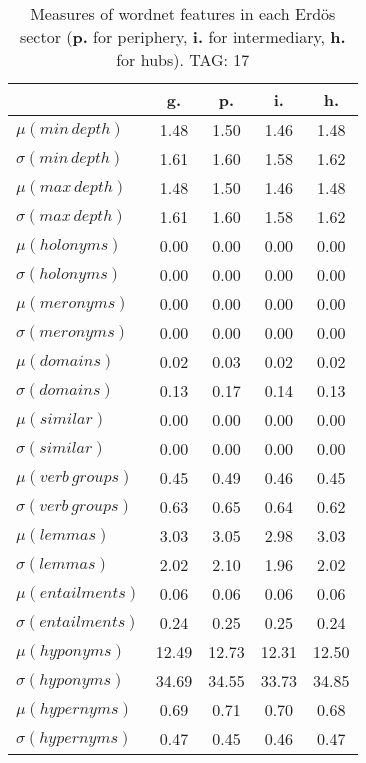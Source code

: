 \begin{table}[h!]
\begin{center}
\begin{tabular}{| l | c | c | c | c |}\hline
 & g. & p. & i. & h. \\\hline
$\mu(min\,depth)$ & 1.48  & 1.50  & 1.46  & 1.48 \\\hline
$\sigma(min\,depth)$ & 1.61  & 1.60  & 1.58  & 1.62 \\\hline
$\mu(max\,depth)$ & 1.48  & 1.50  & 1.46  & 1.48 \\\hline
$\sigma(max\,depth)$ & 1.61  & 1.60  & 1.58  & 1.62 \\\hline
$\mu(holonyms)$ & 0.00  & 0.00  & 0.00  & 0.00 \\\hline
$\sigma(holonyms)$ & 0.00  & 0.00  & 0.00  & 0.00 \\\hline
$\mu(meronyms)$ & 0.00  & 0.00  & 0.00  & 0.00 \\\hline
$\sigma(meronyms)$ & 0.00  & 0.00  & 0.00  & 0.00 \\\hline
$\mu(domains)$ & 0.02  & 0.03  & 0.02  & 0.02 \\\hline
$\sigma(domains)$ & 0.13  & 0.17  & 0.14  & 0.13 \\\hline
$\mu(similar)$ & 0.00  & 0.00  & 0.00  & 0.00 \\\hline
$\sigma(similar)$ & 0.00  & 0.00  & 0.00  & 0.00 \\\hline
$\mu(verb\,groups)$ & 0.45  & 0.49  & 0.46  & 0.45 \\\hline
$\sigma(verb\,groups)$ & 0.63  & 0.65  & 0.64  & 0.62 \\\hline
$\mu(lemmas)$ & 3.03  & 3.05  & 2.98  & 3.03 \\\hline
$\sigma(lemmas)$ & 2.02  & 2.10  & 1.96  & 2.02 \\\hline
$\mu(entailments)$ & 0.06  & 0.06  & 0.06  & 0.06 \\\hline
$\sigma(entailments)$ & 0.24  & 0.25  & 0.25  & 0.24 \\\hline
$\mu(hyponyms)$ & 12.49  & 12.73  & 12.31  & 12.50 \\\hline
$\sigma(hyponyms)$ & 34.69  & 34.55  & 33.73  & 34.85 \\\hline
$\mu(hypernyms)$ & 0.69  & 0.71  & 0.70  & 0.68 \\\hline
$\sigma(hypernyms)$ & 0.47  & 0.45  & 0.46  & 0.47 \\\hline
\end{tabular}
\caption{Measures of wordnet features in each Erd\"os sector ({{\bf p.}} for periphery, {{\bf i.}} for intermediary, {{\bf h.}} for hubs). TAG: 17}
\end{center}
\end{table}